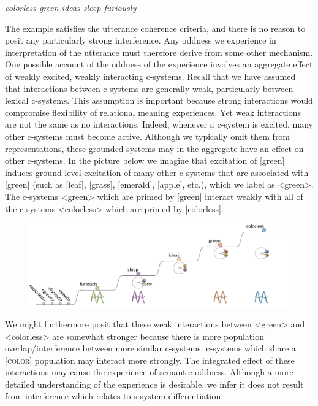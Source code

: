     \textit{colorless green ideas sleep furiously}

  The example satisfies the utterance coherence criteria, and there is no reason to posit any particularly strong interference. Any oddness we experience in interpretation of the utterance must therefore derive from some other mechanism. One possible account of the oddness of the experience involves an aggregate effect of weakly excited, weakly interacting c-systems. Recall that we have assumed that interactions between c-systems are generally weak, particularly between lexical c-systems. This assumption is important because strong interactions would compromise flexibility of relational meaning experiences. Yet weak interactions are not the same as no interactions. Indeed, whenever a c-system is excited, many other c-systems must become active. Although we typically omit them from representations, these grounded systems may in the aggregate have an effect on other c-systems. In the picture below we imagine that excitation of [green] induces ground-level excitation of many other c-systems that are associated with [green] (such as [leaf], [grass], [emerald], [apple], etc.), which we label as <green>. The c-systems <green> which are primed by [green] interact weakly with all of the c-systems <colorless> which are primed by [colorless]. 

  
\begin{figure}
\includegraphics[width=\textwidth]{figures/Tilsen-img134.png}
\caption{\missingcaption}
\label{fig:}
\end{figure}
 

  We might furthermore posit that these weak interactions between <green> and <colorless> are somewhat stronger because there is more population overlap/interference between more similar c-systems: c-systems which share a [\textsc{color}] population may interact more strongly. The integrated effect of these interactions may cause the experience of semantic oddness. Although a more detailed understanding of the experience is desirable, we infer it does not result from interference which relates to s-system differentiation.

